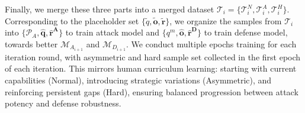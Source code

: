 \documentclass[11pt]{article}
\begin{document}
Finally, we merge these three parts into a merged dataset $\mathcal{T}_{i} = \{\mathcal{T}^{N}_{i}, \mathcal{T}^{A}_{i}, \mathcal{T}^{H}_{i}\}$. Corresponding to the placeholder set $\{\widetilde{q}, \mathbf{\widetilde{o}},\mathbf{\widetilde{r}}\}$, we organize the samples from $\mathcal{T}_{i}$ into $\{\mathcal{P}_{A}, \mathbf{\hat{q}}, \mathbf{\hat{r}^{A}}\}$ to train attack model and $\{q^{m}, \mathbf{\hat{o}}, \mathbf{\hat{r}^{D}}\}$ to train defense model, towards better $\mathcal{M}_{A_{i+1}}$ and $\mathcal{M}_{D_{i+1}}$. We conduct multiple epochs training for each iteration round, with asymmetric and hard sample set collected in the first epoch of each iteration. This mirrors human curriculum learning: starting with current capabilities (Normal), introducing strategic variations (Asymmetric), and reinforcing persistent gaps (Hard), ensuring balanced progression between attack potency and defense robustness.
\end{document}
